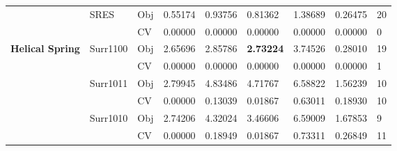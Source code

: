 \begin{table*}[!htb]
\begin{tabular}{lllllllll}
		& SRES                               & Obj                                & 0.55174                            & 0.93756                            & 0.81362                              & 1.38689                             & 0.26475                           & 20               \\
		&                                    & CV                                 & 0.00000                            & 0.00000                            & 0.00000                              & 0.00000                             & 0.00000                           & 0                \\ \hline
		\multirow{16}{*}{\textbf{Helical Spring}}    & Surr1100                           & Obj                                & 2.65696                            & 2.85786                            & \textbf{2.73224}                     & 3.74526                             & 0.28010                           & 19               \\
		&                                    & CV                                 & 0.00000                            & 0.00000                            & 0.00000                              & 0.00000                             & 0.00000                           & 1                \\
		& Surr1011                           & Obj                                & 2.79945                            & 4.83486                            & 4.71767                              & 6.58822                             & 1.56239                           & 10               \\
		&                                    & CV                                 & 0.00000                            & 0.13039                            & 0.01867                              & 0.63011                             & 0.18930                           & 10               \\
		& Surr1010                           & Obj                                & 2.74206                            & 4.32024                            & 3.46606                              & 6.59009                             & 1.67853                           & 9                \\
		&                                    & CV                                 & 0.00000                            & 0.18949                            & 0.01867                              & 0.73311                             & 0.26849                           & 11               \\

\end{tabular}
\end{table*}
